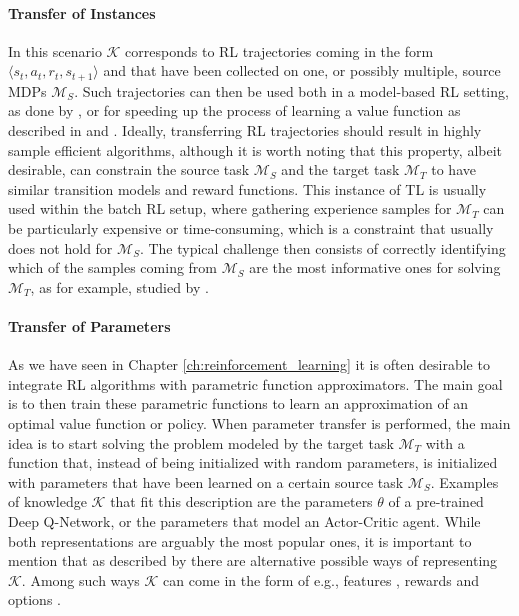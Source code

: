 \paragraph{\textbf{\uppercase{T}ransfer of \uppercase{I}nstances}} In this scenario $\mathcal{K}$ corresponds to RL trajectories coming in the form $\langle s_t, a_t, r_t, s_{t+1}\rangle$ and that have been collected on one, or possibly multiple, source MDPs $\mathcal{M}_S$. Such trajectories can then be used both in a model-based RL setting, as done by \citet{taylor2008transferring}, or for speeding up the process of learning a value function as described in \cite{lazaric2008transfer} and \cite{laroche2017transfer}. Ideally, transferring RL trajectories should result in highly sample efficient algorithms, although it is worth noting that this property, albeit desirable, can constrain the source task $\mathcal{M}_S$ and the target task $\mathcal{M}_T$ to have similar transition models and reward functions. This instance of TL is usually used within the batch RL setup, where gathering experience samples for $\mathcal{M}_T$ can be particularly expensive or time-consuming, which is a constraint that usually does not hold for $\mathcal{M}_S$. The typical challenge then consists of correctly identifying which of the samples coming from $\mathcal{M}_S$ are the most informative ones for solving $\mathcal{M}_T$, as for example, studied by \citet{tirinzoni2018importance}.

\paragraph{\textbf{\uppercase{T}ransfer of \uppercase{P}arameters}} As we have seen in Chapter \ref{ch:reinforcement_learning} it is often desirable to integrate RL algorithms with parametric function approximators. The main goal is to then train these parametric functions to learn an approximation of an optimal value function or policy. When parameter transfer is performed, the main idea is to start solving the problem modeled by the target task $\mathcal{M}_T$ with a function that, instead of being initialized with random parameters, is initialized with parameters that have been learned on a certain source task $\mathcal{M}_S$. Examples of knowledge $\mathcal{K}$ that fit this description are the parameters $\theta$ of a pre-trained Deep Q-Network, or the parameters that model an Actor-Critic agent.  
\bigbreak
While both representations are arguably the most popular ones, it is important to mention that as described by \citet{tirinzoni2018transfer} there are alternative possible ways of representing $\mathcal{K}$. Among such ways $\mathcal{K}$ can come in the form of e.g., features \cite{mehta2008transfer,barreto2017successor}, rewards \cite{konidaris2006autonomous,schaal2004estimating} and options \cite{singh2005intrinsically}.

